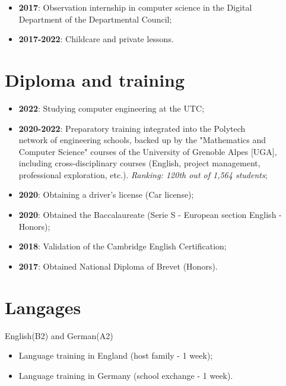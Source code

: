 \documentclass[10pt, oneside, a4paper, titlepage]{article}
\begin{document}
\begin{tcolorbox}
\begin{minipage}[t]{12cm}
\begin{tcolorbox}[grow to right by = 0.6cm, colback = gray!25, colframe = white]
\begin{itemize}
                    \item \textbf{2017}: Observation internship in computer science in the Digital \\Department of the Departmental Council;
                    
                    \item \textbf{2017-2022}: Childcare and private lessons.
                \end{itemize}

                \section*{Diploma and training}
                \begin{itemize}
                    \item \textbf{2022}: Studying computer engineering at the UTC;
                    \item \textbf{2020-2022}: Preparatory training integrated into the Polytech 
                    \\ network of engineering schools, backed up by the "Mathematics 
                    and Computer Science" courses of the University of Grenoble Alpes [UGA], 
                    including cross-disciplinary courses 
                    (English, project management, professional exploration, etc.). \emph{Ranking: 120th out of 1,564 students};
                    \item \textbf{2020}: Obtaining a driver's license (Car license);
                    \item \textbf{2020}: Obtained the Baccalaureate (Serie S - European section English - Honors); 
                    \item \textbf{2018}: Validation of the Cambridge English Certification;
                    \item \textbf{2017}: Obtained National Diploma of Brevet (Honors).
                \end{itemize}

                \section*{Langages}
                    English(B2) and German(A2) 
                    \begin{itemize}
                        \item Language training in England (host family - 1 week);
                        \item Language training in Germany (school exchange - 1 week).
                    \end{itemize}

                
            \end{tcolorbox}
        \end{minipage}
    \end{tcolorbox}
\end{document}
